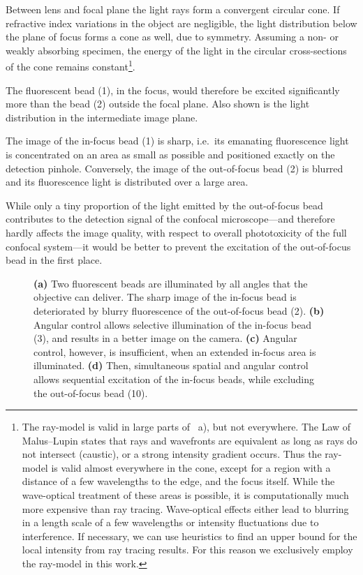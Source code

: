 Between lens and focal plane the light rays form a convergent circular
cone. If refractive index variations in the object are negligible, the
light distribution below the plane of focus forms a cone as well, due
to symmetry.  Assuming a non- or weakly absorbing specimen, the energy
of the light in the circular cross-sections of the cone remains
constant\footnote{The ray-model is valid in large parts of
~a), but not everywhere. The Law of
Malus--Lupin states that rays and wavefronts are equivalent as long as
rays do not intersect (caustic), or %
a strong
intensity gradient occurs. Thus the ray-model is valid almost
everywhere in the cone, except for a region with a distance of a few
wavelengths to the edge, and the focus itself. While the wave-optical
treatment of these areas is possible, it is computationally much more
expensive than ray tracing. Wave-optical effects either lead to
blurring in a length scale of a few wavelengths or intensity
fluctuations due to interference. If necessary, we can use heuristics
to find an upper bound for the local intensity from ray tracing
results. For this reason we exclusively employ the ray-model in this
work.}\label{sec:ray-valid}.


The fluorescent bead (1), in the focus, would therefore be excited
significantly more than the bead (2) outside the focal plane. Also
shown is the light distribution in the intermediate image plane.

The image of the in-focus bead (1) is sharp, i.e.\ its emanating  %
fluorescence light is concentrated on an area as small as possible and
positioned exactly on the detection pinhole. Conversely, the image of
the out-of-focus bead (2) is blurred and its fluorescence light is
distributed over a large area.

While only a tiny proportion of the light emitted by the out-of-focus
bead contributes to the detection signal of the confocal
microscope---and therefore hardly affects the image quality, with
respect to overall phototoxicity of the full confocal system---it
would be better to prevent the excitation of the out-of-focus bead in
the first place.

\begin{figure}[!hbt] \centering {}
  \caption{{\bf (a)} Two fluorescent beads are illuminated by all
angles that the objective can 
deliver. The sharp image of the in-focus bead is deteriorated by
blurry fluorescence of the out-of-focus bead (2). {\bf (b)} Angular
control allows selective illumination of the in-focus bead (3), and
results in a better image on the camera. {\bf (c)} Angular control,
however, is insufficient, when an extended in-focus area is
illuminated. {\bf (d)} Then, simultaneous spatial and angular control
allows sequential excitation of the in-focus beads, while excluding
the out-of-focus bead (10).}
  \label{fig:hourglass-all}
\end{figure}

